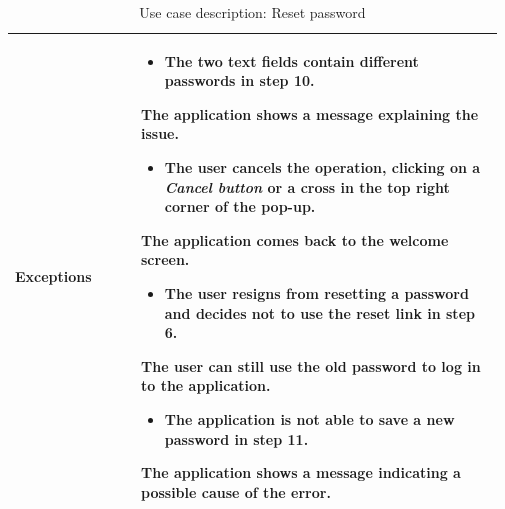 \begin{table}[H]
\begin{tabular}{@{}p{0.25\linewidth} p{0.72\linewidth}@{}}
		\textbf{Exceptions}         & \begin{itemize}[leftmargin=.4cm,noitemsep,topsep=0pt,before=\vspace{-3mm}]
		   \item The two text fields contain different passwords in step 10.
		\end{itemize}
		The application shows a message explaining the issue.
	    \begin{itemize}[leftmargin=.4cm,noitemsep,topsep=0pt]
		   \item The user cancels the operation, clicking on a \textit{Cancel button} or a cross in the top right corner of the pop-up.
		\end{itemize}
		The application comes back to the welcome screen.
	    \begin{itemize}[leftmargin=.4cm,noitemsep,topsep=0pt]
		   \item The user resigns from resetting a password and decides not to use the reset link in step 6.
		\end{itemize}
		The user can still use the old password to log in to the application.
	    \begin{itemize}[leftmargin=.4cm,noitemsep,topsep=0pt]
		   \item The application is not able to save a new password in step 11.
		\end{itemize}
		The application shows a message indicating a possible cause of the error.
		\\\bottomrule
	\end{tabular}
	\caption{Use case description: Reset password} 
\end{table}

